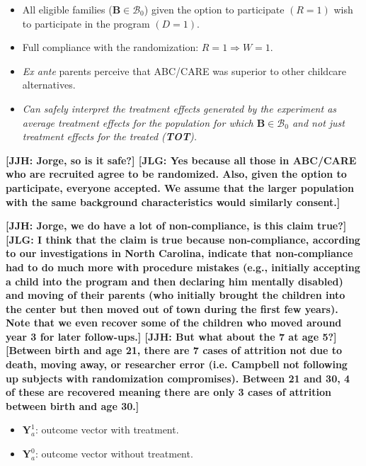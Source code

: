 \documentclass[static]{JJH-Beamer}
\begin{document}
\begin{frame}

\begin{itemize}
\item All eligible families ($\bm{B}\in\mathcal{B}_0$) given the option to participate $(R=1)$ wish to participate in the program $(D=1)$.
\item Full compliance with the randomization: $R=1 \Rightarrow W=1$.
\item \emph{Ex ante} parents perceive that ABC/CARE was superior to other childcare alternatives.
\item \emph{Can safely interpret the treatment effects generated by the experiment as average treatment effects for the population for which $\bm{B}\in\mathcal{B}_0$ and not just treatment effects for the treated (\textbf{TOT}).}
\end{itemize}

\end{frame}

\clearpage

\textbf{[JJH: Jorge, so is it safe?] [JLG: Yes because all those in ABC/CARE who are recruited agree to be randomized. Also, given the option to participate, everyone accepted. We assume that the larger population with the same background characteristics would similarly consent.]}

\textbf{[JJH: Jorge, we do have a lot of non-compliance, is this claim true?] [JLG: I think that the claim is true because non-compliance, according to our investigations in North Carolina, indicate that non-compliance had to do much more with procedure mistakes (e.g., initially accepting a child into the program and then declaring him mentally disabled) and moving of their parents (who initially brought the children into the center but then moved out of town during the first few years). Note that we even recover some of the children who moved around year 3 for later follow-ups.] [JJH: But what about the 7 at age 5?] [Between birth and age 21, there are 7 cases of attrition not due to death, moving away, or researcher error (i.e. Campbell not following up subjects with randomization compromises). Between 21 and 30, 4 of these are recovered meaning there are only 3 cases of attrition between birth and age 30.]}

\clearpage

\begin{frame}

\begin{itemize}
\item $\bm{Y}^1_a$: outcome vector with treatment.
\item $\bm{Y}^0_a$: outcome vector without treatment.
\end{itemize}

\end{frame}
\end{document}
